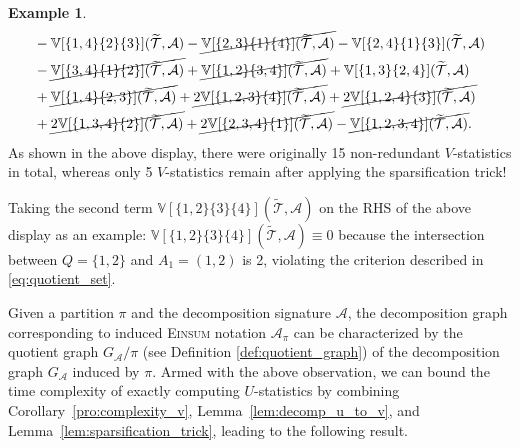 \documentclass[12pt]{article}
\theoremstyle{plain}
\theoremstyle{definition}
\newtheorem{subexample}{Example}
\def\Einsum{\textsc{Einsum}}
\newcommand{\vstat}{\mathbb{V}}
\def\calA{\mathcal{A}}
\def\calT{\mathcal{T}}
\begin{document}
\begin{bibunit}[agsm]
\begin{subexample}
\begin{align*}
& - \vstat[\{1,4\}\{2\}\{3\}](\widetilde{ \calT }, \calA) - \cancel{\vstat[\{2,3\}\{1\}\{4\}](\widetilde{ \calT }, \calA)}
- \vstat[\{2,4\}\{1\}\{3\}](\widetilde{ \calT }, \calA)
 \\
& 
- \cancel{\vstat[\{3,4\}\{1\}\{2\}](\widetilde{ \calT }, \calA)}
+ \cancel{\vstat[\{1,2\}\{3,4\}](\widetilde{ \calT }, \calA)}
+ \vstat[\{1,3\}\{2,4\}](\widetilde{ \calT }, \calA)
 \\
& 
+ \cancel{\vstat[\{1,4\}\{2,3\}](\widetilde{ \calT }, \calA)}
+ \cancel{2\vstat[\{1,2,3\}\{4\}](\widetilde{ \calT }, \calA)}
+ \cancel{2\vstat[\{1,2,4\}\{3\}](\widetilde{ \calT }, \calA)} \\
& 
+ \cancel{2\vstat[\{1,3,4\}\{2\}](\widetilde{ \calT }, \calA)}
+ \cancel{2\vstat[\{2,3,4\}\{1\}](\widetilde{ \calT }, \calA)}
- \cancel{\vstat[\{1,2,3,4\}](\widetilde{ \calT }, \calA)}.
\end{align*}
As shown in the above display, there were originally 15 non-redundant $V$-statistics in total, whereas only 5 $V$-statistics remain after applying the sparsification trick! 

Taking the second term $\vstat[\{1,2\}\{3\}\{4\}](\widetilde{ \calT }, \calA)$ on the RHS of the above display as an example: $\vstat[\{1,2\}\{3\}\{4\}](\widetilde{ \calT }, \calA) \equiv 0$ because the intersection between $Q = \{1, 2\}$ and $A_1 = (1, 2)$ is 2, violating the criterion described in \eqref{eq:quotient_set}.
\end{subexample}



Given a partition $\pi$ and the decomposition signature $\calA$, the decomposition graph corresponding to induced \Einsum{} notation $\calA_\pi$ can be characterized by the quotient graph $G_\calA / \pi$ (see Definition \ref{def:quotient_graph}) of the decomposition graph $G_\calA$ induced by $\pi$. Armed with the above observation, we can bound the time complexity of exactly computing $U$-statistics by combining Corollary~\ref{pro:complexity_v}, Lemma~\ref{lem:decomp_u_to_v}, and Lemma~\ref{lem:sparsification_trick}, leading to the following result.


\end{bibunit}
\end{document}

